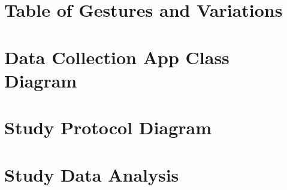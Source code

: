 \appendix

\section{Table of Gestures and Variations}\label{app:gestures}

\section{Data Collection App Class Diagram}

\section{Study Protocol Diagram}\label{app:protocol}

\section{Study Data Analysis}



